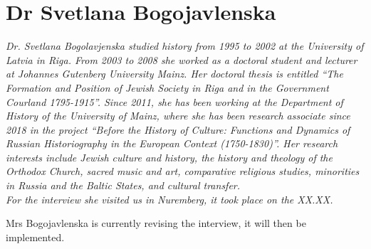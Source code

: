 \section{Dr Svetlana Bogojavlenska}

\textit{Dr. Svetlana Bogolavjenska studied history from 1995 to 2002 at the University of Latvia in Riga. From 2003 to 2008 she worked as a doctoral student and lecturer at Johannes Gutenberg University Mainz. Her doctoral thesis is entitled "`The Formation and Position of Jewish Society in Riga and in the Government Courland 1795-1915"'. Since 2011, she has been working at the Department of History of the University of Mainz, where she has been research associate since 2018 in the project "`Before the History of Culture: Functions and Dynamics of Russian Historiography in the European Context (1750-1830)"'. Her research interests include Jewish culture and history, the history and theology of the Orthodox Church, sacred music and art, comparative religious studies, minorities in Russia and the Baltic States, and cultural transfer.\\
For the interview she visited us in Nuremberg, it took place on the XX.XX.}\par
\vspace*{2em}
Mrs Bogojavlenska is currently revising the interview, it will then be implemented.